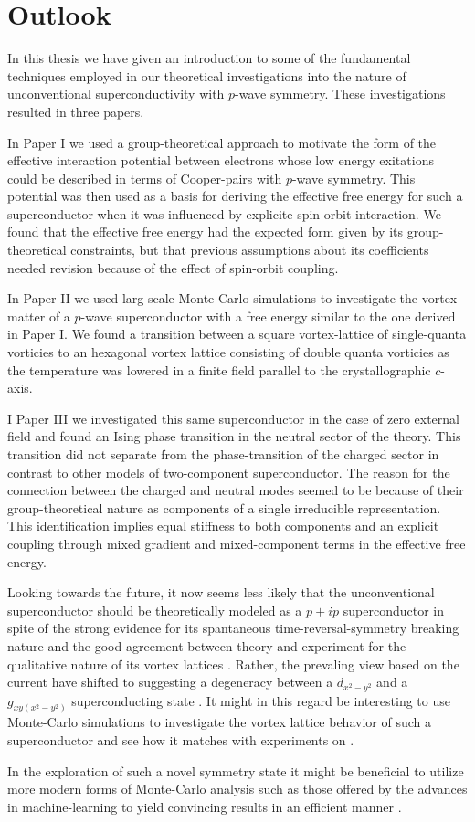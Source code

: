 \chapter{Outlook}\noindent
%
%
In this thesis we have given an introduction to some of the fundamental techniques employed in our theoretical investigations
into the nature of unconventional superconductivity with $p$-wave symmetry. These investigations resulted in three papers.

In Paper I we used a group-theoretical approach to
motivate the form of the effective interaction potential between electrons whose low energy exitations could be described
in terms of Cooper-pairs with $p$-wave symmetry. This potential was then used as a basis for deriving the effective free energy
for such a superconductor when it was influenced by explicite spin-orbit interaction. We found that the effective free energy
had the expected form given by its group-theoretical constraints, but that previous assumptions about its coefficients needed
revision because of the effect of spin-orbit coupling.

In Paper II we used larg-scale Monte-Carlo simulations to investigate the vortex matter of a $p$-wave superconductor with a free
energy similar to the one derived in Paper I. We found a transition between a square vortex-lattice of single-quanta vorticies
to an hexagonal vortex lattice consisting of double quanta vorticies as the temperature was lowered in a finite field parallel
to the crystallographic $c$-axis.

I Paper III we investigated this same superconductor in the case of zero external field and found an Ising phase transition
in the neutral sector of the theory. This transition did not separate from the phase-transition of the charged sector in contrast
to other models of two-component superconductor. The reason for the connection between the charged and neutral modes seemed to
be because of their group-theoretical nature as components of a single
irreducible representation. This identification implies equal stiffness to both components and an explicit coupling through mixed gradient
and mixed-component terms in the effective free energy.

Looking towards the future, it now seems less likely that the unconventional superconductor  should be theoretically
modeled as a $p+ip$ superconductor in spite of the strong evidence for its spantaneous time-reversal-symmetry breaking nature
\cite{Luke98,Xia06,Grinenko20} and the good
agreement between theory and experiment for the qualitative nature of its vortex lattices \cite{Ray14,AsleGaraud16}. Rather, the
prevaling view based on the current have shifted to suggesting a degeneracy between a $d_{x^2-y^2}$ and a $g_{xy(x^2-y^2)}$ 
superconducting state \cite{Kivelson20,Ghosh21}. It might in this regard be interesting to use Monte-Carlo simulations to
investigate the vortex lattice behavior of such a superconductor and see how it matches with experiments on .

In the exploration of such a novel symmetry state it might be beneficial to utilize more modern forms of Monte-Carlo analysis
such as those offered by the advances in machine-learning to yield convincing results in an efficient manner
\cite{Bojesen18,Nagai20,Bedolla20}.
